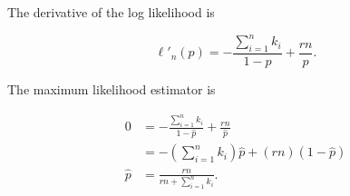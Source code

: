 \noindent
The derivative of the log likelihood is

\begin{equation}
  \ell'_n(p) = -\frac{\sum_{i=1}^{n} k_i}{1-p} + \frac{rn}{p} \text{.}
\end{equation}

\noindent
The maximum likelihood estimator is

\begin{align}
  0 &= -\frac{\sum_{i=1}^{n} k_i}{1-\hat{p}} + \frac{rn}{\hat{p}} \\
    &= -\left(\sum_{i=1}^{n} k_i\right) \hat{p} + \left(rn\right)(1-\hat{p})\\
  \hat{p} &= \boxed{\frac{rn}{rn + \sum_{i=1}^{n} k_i }}\text{.}
\end{align}
